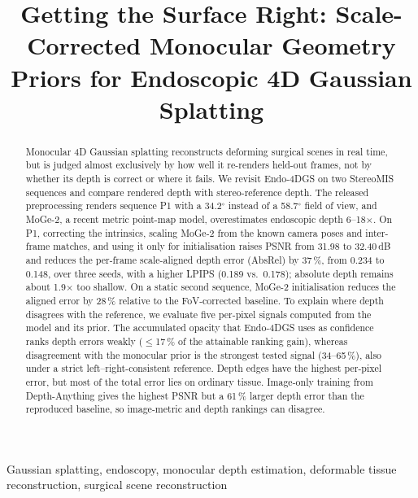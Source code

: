\documentclass[conference]{IEEEtran}
\begin{document}
\title{Getting the Surface Right: Scale-Corrected Monocular Geometry Priors for Endoscopic 4D Gaussian Splatting}

\author{
}

\maketitle

\begin{abstract}
Monocular 4D Gaussian splatting reconstructs deforming surgical scenes in real time, but is judged almost exclusively by how well it re-renders held-out frames, not by whether its depth is correct or where it fails. We revisit Endo-4DGS on two StereoMIS sequences and compare rendered depth with stereo-reference depth. The released preprocessing renders sequence P1 with a 34.2$^\circ$ instead of a 58.7$^\circ$ field of view, and MoGe-2, a recent metric point-map model, overestimates endoscopic depth 6--18$\times$. On P1, correcting the intrinsics, scaling MoGe-2 from the known camera poses and inter-frame matches, and using it only for initialisation raises PSNR from 31.98 to 32.40\,dB and reduces the per-frame scale-aligned depth error (AbsRel) by 37\,\%, from 0.234 to 0.148, over three seeds, with a higher LPIPS (0.189 vs.\ 0.178); absolute depth remains about 1.9$\times$ too shallow. On a static second sequence, MoGe-2 initialisation reduces the aligned error by 28\,\% relative to the FoV-corrected baseline. To explain where depth disagrees with the reference, we evaluate five per-pixel signals computed from the model and its prior. The accumulated opacity that Endo-4DGS uses as confidence ranks depth errors weakly ($\le$17\,\% of the attainable ranking gain), whereas disagreement with the monocular prior is the strongest tested signal (34--65\,\%), also under a strict left--right-consistent reference. Depth edges have the highest per-pixel error, but most of the total error lies on ordinary tissue. Image-only training from Depth-Anything gives the highest PSNR but a 61\,\% larger depth error than the reproduced baseline, so image-metric and depth rankings can disagree.
\end{abstract}

\begin{IEEEkeywords}
Gaussian splatting, endoscopy, monocular depth estimation, deformable tissue reconstruction, surgical scene reconstruction
\end{IEEEkeywords}
\end{document}
